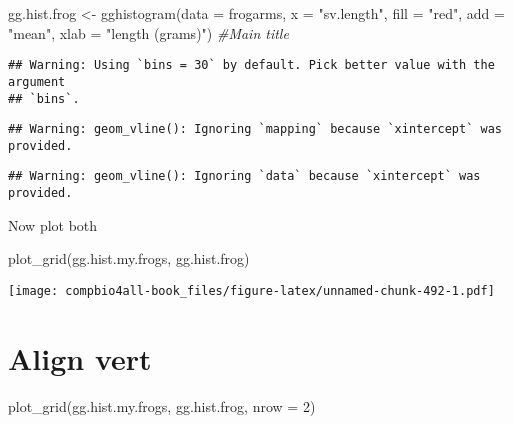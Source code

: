 \documentclass[
]{book}
\newenvironment{Shaded}{\begin{snugshade}}{\end{snugshade}}
\newcommand{\AttributeTok}[1]{\textcolor[rgb]{0.77,0.63,0.00}{#1}}
\newcommand{\CommentTok}[1]{\textcolor[rgb]{0.56,0.35,0.01}{\textit{#1}}}
\newcommand{\DecValTok}[1]{\textcolor[rgb]{0.00,0.00,0.81}{#1}}
\newcommand{\FunctionTok}[1]{\textcolor[rgb]{0.00,0.00,0.00}{#1}}
\newcommand{\NormalTok}[1]{#1}
\newcommand{\OtherTok}[1]{\textcolor[rgb]{0.56,0.35,0.01}{#1}}
\newcommand{\StringTok}[1]{\textcolor[rgb]{0.31,0.60,0.02}{#1}}
\begin{document}
\begin{Shaded}
\begin{Highlighting}[]
\NormalTok{gg.hist.frog }\OtherTok{\textless{}{-}} \FunctionTok{gghistogram}\NormalTok{(}\AttributeTok{data =}\NormalTok{ frogarms,}
            \AttributeTok{x =} \StringTok{"sv.length"}\NormalTok{,}
            \AttributeTok{fill =} \StringTok{"red"}\NormalTok{,}
            \AttributeTok{add =} \StringTok{"mean"}\NormalTok{,}
            \AttributeTok{xlab =} \StringTok{"length (grams)"}\NormalTok{) }\CommentTok{\#Main title}
\end{Highlighting}
\end{Shaded}

\begin{verbatim}
## Warning: Using `bins = 30` by default. Pick better value with the argument
## `bins`.
\end{verbatim}

\begin{verbatim}
## Warning: geom_vline(): Ignoring `mapping` because `xintercept` was provided.
\end{verbatim}

\begin{verbatim}
## Warning: geom_vline(): Ignoring `data` because `xintercept` was provided.
\end{verbatim}

Now plot both

\begin{Shaded}
\begin{Highlighting}[]
\FunctionTok{plot\_grid}\NormalTok{(gg.hist.my.frogs,}
\NormalTok{          gg.hist.frog)}
\end{Highlighting}
\end{Shaded}

\texttt{[image: compbio4all-book\_files/figure-latex/unnamed-chunk-492-1.pdf]}

\hypertarget{align-vert}{%
\section{Align vert}\label{align-vert}}

\begin{Shaded}
\begin{Highlighting}[]
\FunctionTok{plot\_grid}\NormalTok{(gg.hist.my.frogs, }
\NormalTok{          gg.hist.frog,}
          \AttributeTok{nrow =} \DecValTok{2}\NormalTok{)}
\end{Highlighting}
\end{Shaded}
\end{document}
